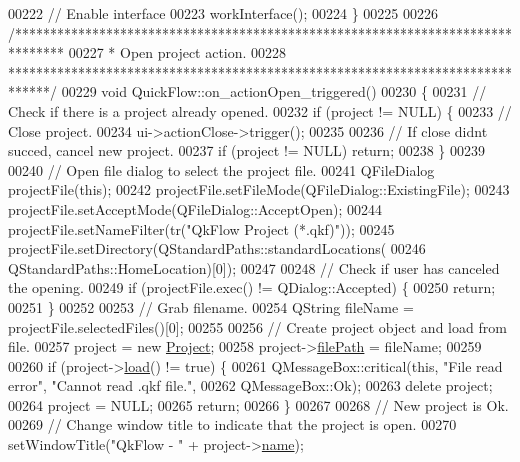 \begin{DoxyCode}
00222   \textcolor{comment}{// Enable interface}
00223   workInterface();
00224 \}
00225 
00226 \textcolor{comment}{/*******************************************************************************}
00227 \textcolor{comment}{ * Open project action.}
00228 \textcolor{comment}{ ******************************************************************************/}
00229 \textcolor{keywordtype}{void} QuickFlow::on\_actionOpen\_triggered()
00230 \{
00231   \textcolor{comment}{// Check if there is a project already opened.}
00232   \textcolor{keywordflow}{if} (project != NULL) \{
00233     \textcolor{comment}{// Close project.}
00234     ui->actionClose->trigger();
00235 
00236     \textcolor{comment}{// If close didnt succed, cancel new project.}
00237     \textcolor{keywordflow}{if} (project != NULL) \textcolor{keywordflow}{return};
00238   \}
00239 
00240   \textcolor{comment}{// Open file dialog to select the project file.}
00241   QFileDialog projectFile(\textcolor{keyword}{this});
00242   projectFile.setFileMode(QFileDialog::ExistingFile);
00243   projectFile.setAcceptMode(QFileDialog::AcceptOpen);
00244   projectFile.setNameFilter(tr(\textcolor{stringliteral}{"QkFlow Project (*.qkf)"}));
00245   projectFile.setDirectory(QStandardPaths::standardLocations(
00246                              QStandardPaths::HomeLocation)[0]);
00247 
00248   \textcolor{comment}{// Check if user has canceled the opening.}
00249   \textcolor{keywordflow}{if} (projectFile.exec() != QDialog::Accepted) \{
00250     \textcolor{keywordflow}{return};
00251   \}
00252 
00253   \textcolor{comment}{// Grab filename.}
00254   QString fileName = projectFile.selectedFiles()[0];
00255 
00256   \textcolor{comment}{// Create project object and load from file.}
00257   project = \textcolor{keyword}{new} \hyperlink{class_project}{Project};
00258   project->\hyperlink{class_project_a79f30adcefd0b72bd4ac7db724bc9531}{filePath} = fileName;
00259 
00260   \textcolor{keywordflow}{if} (project->\hyperlink{class_project_a1e373892a0383371132ce68fa5f8813d}{load}() != \textcolor{keyword}{true}) \{
00261     QMessageBox::critical(\textcolor{keyword}{this}, \textcolor{stringliteral}{"File read error"}, \textcolor{stringliteral}{"Cannot read .qkf file."},
00262                           QMessageBox::Ok);
00263     \textcolor{keyword}{delete} project;
00264     project = NULL;
00265     \textcolor{keywordflow}{return};
00266   \}
00267 
00268   \textcolor{comment}{// New project is Ok.}
00269   \textcolor{comment}{// Change window title to indicate that the project is open.}
00270   setWindowTitle(\textcolor{stringliteral}{"QkFlow - "} + project->\hyperlink{class_project_a82dd2d1bc38f9fd08c9a811fcaa76b38}{name});

\end{DoxyCode}
